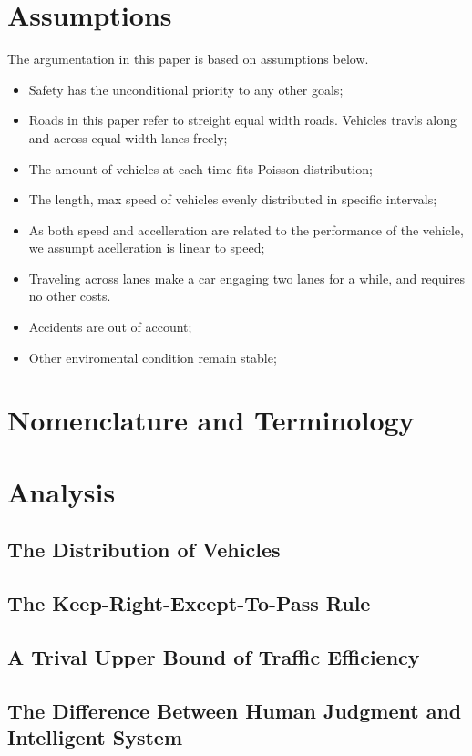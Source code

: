 \section{Assumptions}
The argumentation in this paper is based on assumptions below. 
\begin{itemize}
  \item Safety has the unconditional priority to any other goals; 
  \item Roads in this paper refer to streight equal width roads. Vehicles travls along and across equal width lanes freely; 
  \item The amount of vehicles at each time fits Poisson distribution\cite{breiman1963}; 
  \item The length, max speed of vehicles evenly distributed in specific intervals; 
  \item As both speed and accelleration are related to the performance of the vehicle, we assumpt acelleration is linear to speed; 
  \item Traveling across lanes make a car engaging two lanes for a while, and requires no other costs. 
  \item Accidents are out of account; 
  \item Other enviromental condition remain stable; 
\end{itemize}
\section{Nomenclature and Terminology}

\section{Analysis}
\subsection{The Distribution of Vehicles}

\subsection{The Keep-Right-Except-To-Pass Rule}

\subsection{A Trival Upper Bound of Traffic Efficiency}

\subsection{The Difference Between Human Judgment and Intelligent System}
